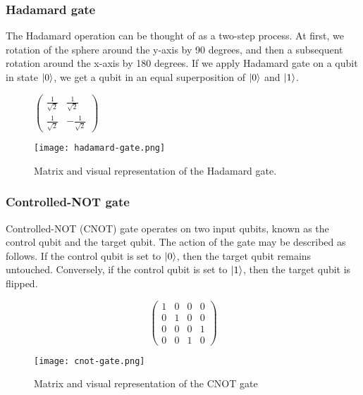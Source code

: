 \subsubsection*{Hadamard gate}
The Hadamard operation can be thought of as a two-step process. At first, we rotation of the sphere around the y-axis by 90 degrees, and then a subsequent rotation around the x-axis by 180 degrees. If we apply Hadamard gate on a qubit in state $\lvert0\rangle$, we get a qubit in an equal superposition of $\lvert0\rangle$ and $\lvert1\rangle$.
\begin{figure}[H]
    \centering
    \begin{minipage}{0.4\linewidth}
      \centering
      $\begin{pmatrix} 
        \frac{1}{\sqrt{2}} &  \frac{1}{\sqrt{2}}  \\
        \frac{1}{\sqrt{2}}  &  -\frac{1}{\sqrt{2}} 
        \end{pmatrix}$
    \end{minipage}
    \begin{minipage}{0.25\linewidth}
      \centering
      \texttt{[image: hadamard-gate.png]}
    \end{minipage}
    \caption{Matrix and visual representation of the Hadamard gate.}
\end{figure}

\subsubsection*{Controlled-NOT gate} 
Controlled-NOT (CNOT) gate operates on two input qubits, known as the control qubit and the target qubit. The action of the gate may be described as follows. If the control qubit is set to $\lvert0\rangle$, then the target qubit remains untouched. Conversely, if the control qubit is set to $\lvert1\rangle$, then the target qubit is flipped.

\begin{figure}[H]
  \centering
  \begin{minipage}{0.4\linewidth}
    \centering
    $$\begin{pmatrix}
      1 & 0 & 0 & 0 \\
      0 & 1 & 0 & 0 \\
      0 & 0 & 0 & 1 \\
      0 & 0 & 1 & 0
  \end{pmatrix}$$
  \end{minipage}
  \begin{minipage}{0.25\linewidth}
    \centering
    \texttt{[image: cnot-gate.png]}
  \end{minipage}
  \caption{Matrix and visual representation of the CNOT gate}
\end{figure}

